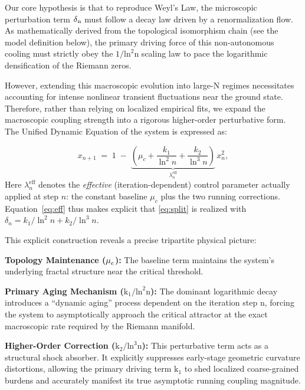 \documentclass[fractalfract,article,submit,oneauthor,pdftex]{Definitions/mdpi}
\begin{document}
Our core hypothesis is that to reproduce Weyl's Law, the microscopic
perturbation term \(\text{\ensuremath{\delta}}_{\text{n}}\) must follow a decay law driven
by a renormalization flow. As mathematically derived from the
topological isomorphism chain (see the model definition below), the primary driving
force of this non-autonomous cooling must strictly obey the
\(\text{1/}\text{ln}^{\text{2}}\text{n}\) scaling law to pace the
logarithmic densification of the Riemann zeros.

However, extending this macroscopic evolution into large-N regimes
necessitates accounting for intense nonlinear transient fluctuations
near the ground state. Therefore, rather than relying on localized
empirical fits, we expand the macroscopic coupling strength into a
rigorous higher-order perturbative form. The Unified Dynamic Equation of
the system is expressed as:

\begin{equation}\label{eq:eff}
x_{n+1} \;=\; 1 \;-\; \underbrace{\left( \mu_c + \frac{k_1}{\ln^2 n} + \frac{k_2}{\ln^3 n} \right)}_{\displaystyle \lambda_n^{\mathrm{eff}}}\, x_n^{2},
\end{equation}
 Here $\lambda_n^{\mathrm{eff}}$ denotes the \emph{effective} (iteration-dependent) control parameter actually applied at step $n$: the constant baseline $\mu_c$ plus the two running corrections. Equation~\eqref{eq:eff} thus makes explicit that \eqref{eq:split} is realized with $\delta_n = k_1/\ln^2 n + k_2/\ln^3 n$.

This explicit construction reveals a precise tripartite physical
picture:

\textbf{Topology Maintenance (}\(\text{\ensuremath{\mu}}_{\text{c}}\)\textbf{):} The
baseline term maintains the system's underlying fractal structure near
the critical threshold.

\textbf{Primary Aging Mechanism
(}\(\text{k}_{\text{1}}\text{/}\text{ln}^{\text{2}}\text{n}\)\textbf{):}
The dominant logarithmic decay introduces a ``dynamic aging'' process
dependent on the iteration step \(\text{n}\), forcing the system to
asymptotically approach the critical attractor at the exact macroscopic
rate required by the Riemann manifold.

\textbf{Higher-Order Correction
(}\(\text{k}_{\text{2}}\text{/}\text{ln}^{\text{3}}\text{n}\)\textbf{):}
This perturbative term acts as a structural shock absorber. It
explicitly suppresses early-stage geometric curvature distortions,
allowing the primary driving term \(\text{k}_{\text{1}}\) to shed
localized coarse-grained burdens and accurately manifest its true
asymptotic running coupling magnitude.
\end{document}
